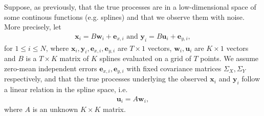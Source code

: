 \documentclass[preprint]{imsart}
\numberwithin{equation}{section}
\theoremstyle{plain}
\newcommand{\cN}{\mathcal{N}}
\newcommand{\tr}[1]{{\textcolor{red}{#1}}}
\newcommand{\by}{\mathbf{y}}
\newcommand{\bx}{\mathbf{x}}
\newcommand{\bw}{\mathbf{w}}
\newcommand{\bu}{\mathbf{u}}
\newcommand{\be}{\mathbf{e}}
\begin{document}


Suppose, as previously, that the true processes are in a low-dimensional space of some continous functions (e.g. splines) and that we observe them with noise. More precisely, let
\begin{align}\label{eq:definitions-xy}
  \bx_i = B\bw_i + \be_{x,i} \text{\ \ and\ \ } \by_i = B\bu_i + \be_{y,i},
\end{align}
for $1 \leq i \leq N$, where $\bx_i,\by_i,\be_{x,i},\be_{y,i}$ are $T \times 1$ vectors, $\bw_i, \bu_i$ are $K \times 1$ vectors and $B$ is a $T \times K$ matrix of $K$ splines evaluated on a grid of $T$ points. We assume zero-mean independent errors $\be_{x,i},\be_{y,i}$ with fixed covariance matrices $\Sigma_X,\Sigma_Y$ respectively, and that the true processes underlying the observed $\bx_i$ and $\by_i$ follow a linear relation in the spline space, i.e.
\begin{align}\label{eq:linear-xy}
  \bu_i = A\bw_i,
\end{align}
where $A$ is an unknown $K \times K$ matrix.
\end{document}
